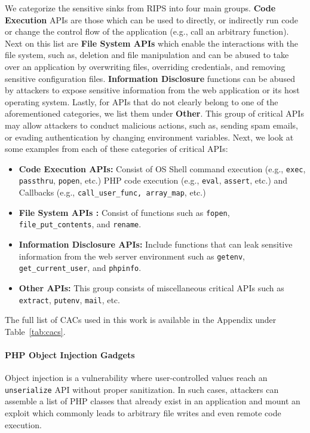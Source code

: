 We categorize the sensitive sinks from RIPS into four main groups. \textbf{Code Execution} APIs are those which can be used to directly, or indirectly run code or change the control flow of the application (e.g., call an arbitrary function). 
Next on this list are \textbf{File System APIs} which enable the interactions with the file system, such as, deletion and file manipulation and can be abused to take over an application by overwriting files, overriding credentials, and removing sensitive configuration files. 
\textbf{Information Disclosure} functions can be abused by attackers to expose sensitive information from the web application or its host operating system. 
Lastly, for APIs that do not clearly belong to one of the aforementioned categories, we list them under \textbf{Other}. 
This group of critical APIs may allow attackers to conduct malicious actions, such as, sending spam emails, or evading authentication by changing environment variables. 
Next, we look at some examples from each of these categories of critical APIs: 

\begin{itemize}
    \item \textbf{Code Execution APIs:} Consist of OS Shell command execution (e.g., \texttt{exec}, \texttt{passthru}, \texttt{popen}, etc.) PHP code execution (e.g., \texttt{eval}, \texttt{assert}, etc.) and Callbacks (e.g., \texttt{call\_user\_func, array\_map}, etc.)
    \item \textbf{File System APIs :} Consist of functions such as \texttt{fopen}, \texttt{file\_put\_contents}, and \texttt{rename}.
    \item \textbf{Information Disclosure APIs:} Include functions that can leak sensitive information from the web server environment such as \texttt{getenv}, \texttt{get\_current\_user}, and \texttt{phpinfo}.
    \item \textbf{Other APIs:} This group consists of miscellaneous critical APIs such as \texttt{extract}, \texttt{putenv}, \texttt{mail}, etc.
\end{itemize}

The full list of CACs used in this work is available in the Appendix under Table~\ref{tab:cacs}.
    
\paragraph{PHP Object Injection Gadgets}
Object injection is a vulnerability where user-controlled values reach an \texttt{unserialize} API without proper sanitization. 
In such cases, attackers can assemble a list of PHP classes that already exist in an application and mount an exploit which commonly leads to arbitrary file writes and even remote code execution. 

